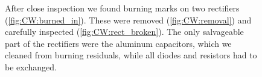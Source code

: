 \begin{refsection}
\begin{figure}[ht]
\caption{After close inspection we found burning marks on two rectifiers (\ref{fig:CW:burned_in}). 
These were removed (\ref{fig:CW:removal}) and carefully inspected (\ref{fig:CW:rect_broken}). 
The only salvageable part of the rectifiers were the aluminum capacitors, which we cleaned from burning residuals, while all diodes and resistors had to be exchanged.}
\label{fig:CW:broken}
\end{figure}

\begin{figure}[ht]   
\centering
{}\\

\end{figure}
\end{refsection}
